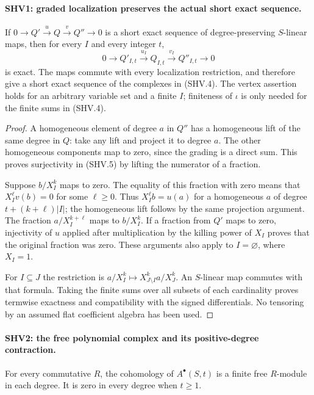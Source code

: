 \paragraph{SHV1: graded localization preserves the actual short exact sequence.}
\label{claim:SHV1}
If $0\to Q'\xrightarrow{u}Q\xrightarrow{v}Q''\to0$ is a short
exact sequence of degree-preserving $S$-linear maps, then for every
$I$ and every integer $t$,
\[
 0\longrightarrow Q'_{I,t}\xrightarrow{u_I}Q_{I,t}
   \xrightarrow{v_I}Q''_{I,t}\longrightarrow0
                                                        \tag{SHV.5}
\]
is exact.  The maps commute with every localization restriction, and
therefore give a short exact sequence of the complexes in (SHV.4).
The vertex assertion holds for an arbitrary variable set and a finite
$I$; finiteness of $\iota$ is only needed for the finite sums in (SHV.4).

\begin{proof}
A homogeneous element of degree $a$ in $Q''$ has a homogeneous lift
of the same degree in $Q$: take any lift and project it to degree $a$.
The other homogeneous components map to zero, since the grading is a
direct sum.  This proves surjectivity in (SHV.5) by lifting the
numerator of a fraction.

Suppose $b/X_I^k$ maps to zero.  The equality of this fraction with
zero means that $X_I^\ell v(b)=0$ for some $\ell\ge0$.
Thus $X_I^\ell b=u(a)$ for a homogeneous $a$ of degree
$t+(k+\ell)|I|$; the homogeneous lift follows by the same projection
argument.  The fraction $a/X_I^{k+\ell}$ maps to $b/X_I^k$.
If a fraction from $Q'$ maps to zero, injectivity of $u$ applied
after multiplication by the killing power of $X_I$ proves that the
original fraction was zero.  These arguments also apply to
$I=\varnothing$, where $X_I=1$.

For $I\subseteq J$ the restriction is
$a/X_I^k\mapsto X_{J\setminus I}^ka/X_J^k$.
An $S$-linear map commutes with that formula.  Taking the finite
sums over all subsets of each cardinality proves termwise exactness
and compatibility with the signed differentials.  No tensoring by
an assumed flat coefficient algebra has been used.
\end{proof}

\paragraph{SHV2: the free polynomial complex and its positive-degree contraction.}
\label{claim:SHV2}
For every commutative $R$, the cohomology of $A^\bullet(S,t)$
is a finite free $R$-module in each degree.  It is zero in every
degree when $t\ge1$.

